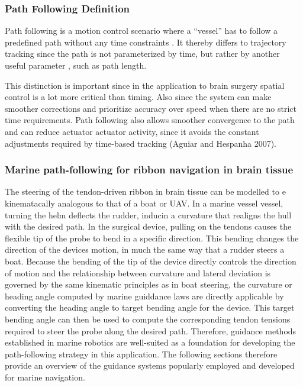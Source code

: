 \subsubsection{Path Following Definition}
Path following is a  motion control scenario where a “vessel” has to follow a predefined path without any time constraints \cite{caharija_integral_2016}. It thereby differs to trajectory tracking since the path is not parameterized by time, but rather by another useful parameter \cite{hung_review_2023}, such as path length. 

This distinction is important since in the application to brain surgery spatial control is a lot more critical than timing. Also since the system can make smoother corrections and prioritize accuracy over speed when there are no strict time requirements. Path following also allows smoother convergence to the path and can reduce actuator actuator activity, since it avoids the constant adjustments required by time-based tracking (Aguiar and Hespanha 2007).

\subsubsection{Marine path-following for ribbon navigation in brain tissue}
The steering of the tendon-driven ribbon in brain tissue can be modelled to e kinematacally analogous to that of a boat or UAV. In a marine vessel vessel, turning the helm deflects the rudder, inducin a curvature that realigns the hull with the desired path. In the surgical device, pulling on the tendons causes the flexible tip of the probe to bend in a specific direction. This bending changes the direction of the devices motion, in much the same way that a rudder steers a boat. 
\newline \newline 
Because the bending of the tip of the device directly controls the direction of motion and the relationship between curvature and lateral deviation is governed by the same kinematic principles as in boat steering, the curvature or heading angle computed by marine guiddance laws are directly applicable by converting the heading angle to target bending angle for the device. This target bending angle can then be used to compute the corresponding tendon tensions required to steer the probe along the desired path.
\newline \newline 
Therefore, guidance methods established in marine robotics are well-suited as a foundation for developing the path-following strategy in this application. The following sections therefore provide an overview of the guidance systems popularly employed and developed for marine navigation.

